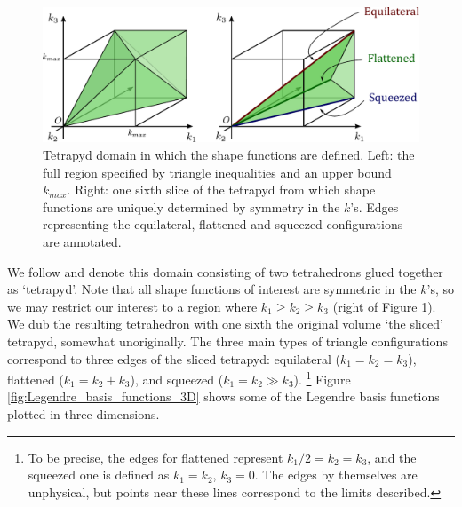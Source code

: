 \begin{figure}[htbp!] 
	\centering    
	\hspace{10pt}
	\includegraphics[width=1.0\textwidth]{tetrapyd.pdf}
	\caption{Tetrapyd domain in which the shape functions are defined. Left: the full region specified by triangle inequalities and an upper bound $k_{max}$. Right: one sixth slice of the tetrapyd from which shape functions are uniquely determined by symmetry in the $k$'s. Edges representing the equilateral, flattened and squeezed configurations are annotated.}
	\label{fig:tetrapyd}
\end{figure}

We follow \cite{Fergusson2010general} and denote this domain consisting of two tetrahedrons glued together as `tetrapyd'. Note that all shape functions of interest are symmetric in the $k$'s, so we may restrict our interest to a region where $k_1 \ge k_2 \ge k_3$ (right of Figure \ref{fig:tetrapyd}). We dub the resulting tetrahedron with one sixth the original volume `the sliced' tetrapyd, somewhat unoriginally. The three main types of triangle configurations correspond to three edges of the sliced tetrapyd: equilateral ($k_1=k_2=k_3$), flattened ($k_1 = k_2 + k_3$), and squeezed ($k_1 = k_2 \gg k_3$). \footnote{To be precise, the edges for flattened represent $k_1/2 = k_2 = k_3$, and the squeezed one is defined as $k_1=k_2$, $k_3=0$. The edges by themselves are unphysical, but points near these lines correspond to the limits described.} Figure \ref{fig:Legendre_basis_functions_3D} shows some of the Legendre basis functions plotted in three dimensions.

